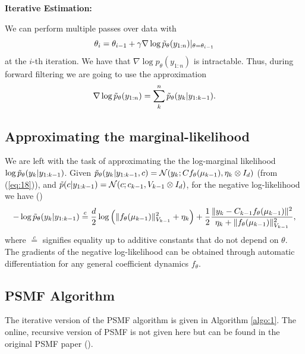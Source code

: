 \documentclass{mldsmsc}
\begin{document}
\noindent \textbf{Iterative Estimation:} \newline

\noindent We can perform multiple passes over data with 
\begin{equation}
    \theta_i = \theta_{i-1} + \gamma \nabla \log \Tilde{p}_{\theta}(y_{1:n}) \vert_{\theta = \theta_{i-1}}
\end{equation}
at the $i$-th iteration. We have that $\nabla \log p_{\theta}(y_{1:n})$ is intractable. Thus, during forward filtering we are going to use the approximation
\begin{equation}
    \nabla \log \Tilde{p}_{\theta}(y_{1:n}) = \sum_k^n \Tilde{p}_{\theta}(y_k | y_{1:k-1}).
\end{equation}

\subsection{Approximating the marginal-likelihood}\label{subsec:aml}

We are left with the task of approximating the the log-marginal likelihood $\log \Tilde{p}_{\theta}(y_k | y_{1:k-1})$. Given $\Tilde{p}_{\theta}(y_k | y_{1:k-1}, c) = \mathcal{N}(y_k; C f_{\theta}(\mu_{k-1}), \eta_k \otimes I_d)$ (from (\ref{eq:18})), and $\Tilde{p}(c | y_{1:k-1}) = \mathcal{N}(c; c_{k-1}, V_{k-1} \otimes I_d)$, for the negative log-likelihood we have (\cite{akyildiz2021probabilistic})
\begin{equation}
    -\log \Tilde{p}_{\theta}(y_k | y_{1:k-1}) \overset{c}{=} \frac{d}{2} \log \left(\Vert f_{\theta}(\mu_{k-1}) \Vert_{V_{k-1}}^2 + \eta_k\right) + \frac{1}{2} \frac{\Vert y_k - C_{k-1} f_{\theta}(\mu_{k-1}) \Vert^2}{\eta_k + \Vert f_{\theta}(\mu_{k-1}) \Vert^2_{V_{k-1}}},
\end{equation}
where $\overset{c}{=}$ signifies equality up to additive constants that do not depend on $\theta$. The gradients of the negative log-likelihood can be obtained through automatic differentiation for any general coefficient dynamics $f_{\theta}$.

\subsection{PSMF Algorithm}

The iterative version of the PSMF algorithm is given in Algorithm \ref{algo:1}. The online, recursive version of PSMF is not given here but can be found in the original PSMF paper (\cite{akyildiz2021probabilistic}).
\end{document}
